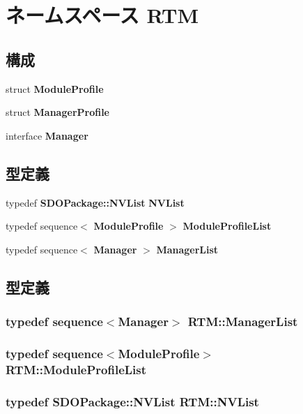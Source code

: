 \section{ネームスペース RTM}
\label{namespaceRTM}
\subsection*{構成}
\begin{DoxyCompactItemize}
\item 
struct {\bf ModuleProfile}
\item 
struct {\bf ManagerProfile}
\item 
interface {\bf Manager}
\end{DoxyCompactItemize}
\subsection*{型定義}
\begin{DoxyCompactItemize}
\item 
typedef {\bf SDOPackage::NVList} {\bf NVList}
\item 
typedef sequence$<$ {\bf ModuleProfile} $>$ {\bf ModuleProfileList}
\item 
typedef sequence$<$ {\bf Manager} $>$ {\bf ManagerList}
\end{DoxyCompactItemize}


\subsection{型定義}
\subsubsection[{ManagerList}]{\setlength{\rightskip}{0pt plus 5cm}typedef sequence$<${\bf Manager}$>$ {\bf RTM::ManagerList}}\label{namespaceRTM_addca378d20c0696c09cb3d748e9cc00e}
\subsubsection[{ModuleProfileList}]{\setlength{\rightskip}{0pt plus 5cm}typedef sequence$<${\bf ModuleProfile}$>$ {\bf RTM::ModuleProfileList}}\label{namespaceRTM_ad72e4fc13cf5a19fc5b766a4be388f89}
\subsubsection[{NVList}]{\setlength{\rightskip}{0pt plus 5cm}typedef {\bf SDOPackage::NVList} {\bf RTM::NVList}}\label{namespaceRTM_a45f18393ee434c9e3a1432820eb3a4fe}
